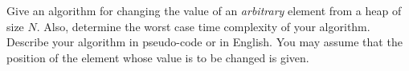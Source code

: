 Give an algorithm for changing the value of an {\em arbitrary} element
from a heap of size $N$.  Also, determine the worst case time complexity
of your algorithm.  Describe your algorithm in pseudo-code or in
English. You may assume that the position of the element whose value is
to be changed is given.


